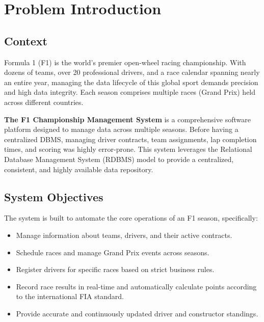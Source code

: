 \documentclass[12pt, a4paper]{report}
\begin{document}
\chapter{Problem Introduction}

\section{Context}
Formula 1 (F1) is the world's premier open-wheel racing championship. With dozens of teams, over 20 professional drivers, and a race calendar spanning nearly an entire year, managing the data lifecycle of this global sport demands precision and high data integrity. Each season comprises multiple races (Grand Prix) held across different countries.

\textbf{The F1 Championship Management System} is a comprehensive software platform designed to manage data across multiple seasons. Before having a centralized DBMS, managing driver contracts, team assignments, lap completion times, and scoring was highly error-prone. This system leverages the Relational Database Management System (RDBMS) model to provide a centralized, consistent, and highly available data repository.

\section{System Objectives}
The system is built to automate the core operations of an F1 season, specifically:
\begin{itemize}[leftmargin=1.5cm]
    \item Manage information about teams, drivers, and their active contracts.
    \item Schedule races and manage Grand Prix events across seasons.
    \item Register drivers for specific races based on strict business rules.
    \item Record race results in real-time and automatically calculate points according to the international FIA standard.
    \item Provide accurate and continuously updated driver and constructor standings.
\end{itemize}
\end{document}

